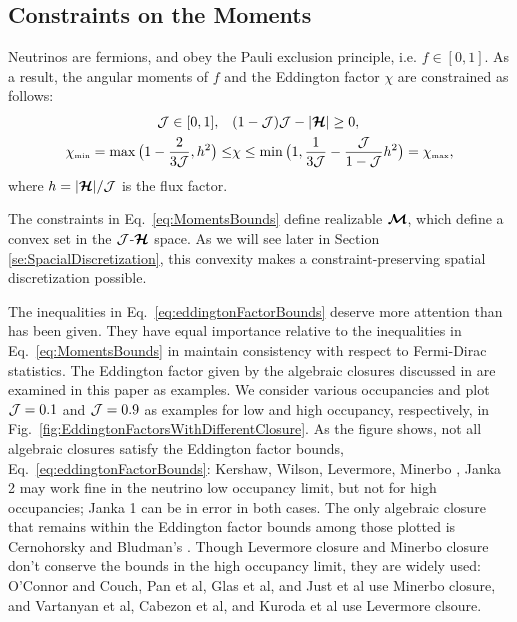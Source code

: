 \subsection{Constraints on the Moments}
Neutrinos are fermions, and obey the Pauli exclusion principle, i.e. $f \in [0,1]$.
As a result, the angular moments of $f$ and the Eddington factor $\chi$ are constrained as follows\cite{levermore_1984,lareckiBanach_2011,kershaw_1976,shohatTamarkin_1943}: 
\begin{align}
\mathcal{J} \in[0,1], \quad &(1-\mathcal{J})\mathcal{J}-|\boldsymbol{\mathcal{H}}| \geq 0, \label{eq:MomentsBounds}\\
  \chi_{\mbox{\tiny min}}
  =\max\big(1-\frac{2}{3\mathcal{J}},h^{2}\big)
  \leq & \chi \leq \min\big(1,\frac{1}{3\mathcal{J}}-\frac{\mathcal{J}}{1-\mathcal{J}}h^{2}\big)=\chi_{\mbox{\tiny max}},
  \label{eq:eddingtonFactorBounds}
\end{align}
where $h = |\boldsymbol{\mathcal{H}}|/\mathcal{J}$ is the flux factor.

The constraints in Eq.~\eqref{eq:MomentsBounds} define realizable $\boldsymbol{\mathcal{M}}$, which define a convex set in the $\mathcal{J}$-$\boldsymbol{\mathcal{H}}$ space.
As we will see later in Section \ref{se:SpacialDiscretization}, this convexity makes a constraint-preserving spatial discretization possible.

The inequalities in Eq.~\eqref{eq:eddingtonFactorBounds} deserve more attention than has been given.
They have equal importance relative to the inequalities in Eq.~\eqref{eq:MomentsBounds} in maintain consistency with respect to Fermi-Dirac statistics.
The Eddington factor given by the algebraic closures discussed in \cite{murchikova_etal_2017} are examined in this paper as examples.
We consider various occupancies and plot $\mathcal{J} = 0.1$ and $\mathcal{J} = 0.9$ as examples for low and high occupancy, respectively, in Fig.~\eqref{fig:EddingtonFactorsWithDifferentClosure}.
As the figure shows, not all algebraic closures satisfy the Eddington factor bounds, Eq.~\eqref{eq:eddingtonFactorBounds}: Kershaw\cite{kershaw_1976}, Wilson\cite{wilson_1975,leblancWilson_1970}, Levermore\cite{levermore_1984}, Minerbo \cite{minerbo_1978}, Janka 2\cite{janka_1992} may work fine in the neutrino low occupancy limit, but not for high occupancies; Janka 1\cite{janka_1991} can be in error in both cases.
The only algebraic closure that remains within the Eddington factor bounds among those plotted is Cernohorsky and Bludman's \cite{cernohorskyBludman_1994}.
Though Levermore closure and Minerbo closure don't conserve the bounds in the high occupancy limit, they are widely used: {O'Connor} and {Couch}\cite{oConnorCouch_2018}, Pan et al\cite{pan_etal_2018}, Glas et al\cite{glas_etal_2018}, and Just et al\cite{just_etal_2018} use Minerbo closure, and Vartanyan et al\cite{vartanyan_etal_2018}, Cabezon et al\cite{cabezon_etal_2018}, and Kuroda et al\cite{kuroda_etal_2016} use Levermore clsoure.

